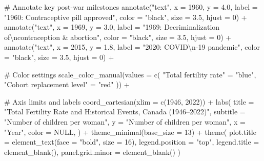 \documentclass[
  letterpaper,
  DIV=11,
  numbers=noendperiod]{scrartcl}
\newenvironment{Shaded}{\begin{snugshade}}{\end{snugshade}}
\newcommand{\AttributeTok}[1]{\textcolor[rgb]{0.40,0.45,0.13}{#1}}
\newcommand{\CommentTok}[1]{\textcolor[rgb]{0.37,0.37,0.37}{#1}}
\newcommand{\ConstantTok}[1]{\textcolor[rgb]{0.56,0.35,0.01}{#1}}
\newcommand{\DecValTok}[1]{\textcolor[rgb]{0.68,0.00,0.00}{#1}}
\newcommand{\FloatTok}[1]{\textcolor[rgb]{0.68,0.00,0.00}{#1}}
\newcommand{\FunctionTok}[1]{\textcolor[rgb]{0.28,0.35,0.67}{#1}}
\newcommand{\NormalTok}[1]{\textcolor[rgb]{0.00,0.23,0.31}{#1}}
\newcommand{\OtherTok}[1]{\textcolor[rgb]{0.00,0.23,0.31}{#1}}
\newcommand{\SpecialCharTok}[1]{\textcolor[rgb]{0.37,0.37,0.37}{#1}}
\newcommand{\StringTok}[1]{\textcolor[rgb]{0.13,0.47,0.30}{#1}}
\begin{document}
\begin{Shaded}
\begin{Highlighting}[]
  \CommentTok{\# Annotate key post{-}war milestones}
  \FunctionTok{annotate}\NormalTok{(}\StringTok{"text"}\NormalTok{, }\AttributeTok{x =} \DecValTok{1960}\NormalTok{, }\AttributeTok{y =} \FloatTok{4.0}\NormalTok{, }\AttributeTok{label =} \StringTok{"1960: Contraceptive pill approved"}\NormalTok{,}
           \AttributeTok{color =} \StringTok{"black"}\NormalTok{, }\AttributeTok{size =} \FloatTok{3.5}\NormalTok{, }\AttributeTok{hjust =} \DecValTok{0}\NormalTok{) }\SpecialCharTok{+}
  \FunctionTok{annotate}\NormalTok{(}\StringTok{"text"}\NormalTok{, }\AttributeTok{x =} \DecValTok{1969}\NormalTok{, }\AttributeTok{y =} \FloatTok{3.0}\NormalTok{, }\AttributeTok{label =} \StringTok{"1969: Decriminalization of}\SpecialCharTok{\textbackslash{}n}\StringTok{contraception \& abortion"}\NormalTok{,}
           \AttributeTok{color =} \StringTok{"black"}\NormalTok{, }\AttributeTok{size =} \FloatTok{3.5}\NormalTok{, }\AttributeTok{hjust =} \DecValTok{0}\NormalTok{) }\SpecialCharTok{+}
  \FunctionTok{annotate}\NormalTok{(}\StringTok{"text"}\NormalTok{, }\AttributeTok{x =} \DecValTok{2015}\NormalTok{, }\AttributeTok{y =} \FloatTok{1.8}\NormalTok{, }\AttributeTok{label =} \StringTok{"2020: COVID}\SpecialCharTok{\textbackslash{}n}\StringTok{{-}19 pandemic"}\NormalTok{,}
           \AttributeTok{color =} \StringTok{"black"}\NormalTok{, }\AttributeTok{size =} \FloatTok{3.5}\NormalTok{, }\AttributeTok{hjust =} \DecValTok{0}\NormalTok{) }\SpecialCharTok{+}

  \CommentTok{\# Color settings}
  \FunctionTok{scale\_color\_manual}\NormalTok{(}\AttributeTok{values =} \FunctionTok{c}\NormalTok{(}
    \StringTok{"Total fertility rate"} \OtherTok{=} \StringTok{"blue"}\NormalTok{,}
    \StringTok{"Cohort replacement level"} \OtherTok{=} \StringTok{"red"}
\NormalTok{  )) }\SpecialCharTok{+}

  \CommentTok{\# Axis limits and labels}
  \FunctionTok{coord\_cartesian}\NormalTok{(}\AttributeTok{xlim =} \FunctionTok{c}\NormalTok{(}\DecValTok{1946}\NormalTok{, }\DecValTok{2022}\NormalTok{)) }\SpecialCharTok{+}
  \FunctionTok{labs}\NormalTok{(}
    \AttributeTok{title =} \StringTok{"Total Fertility Rate and Historical Events, Canada (1946–2022)"}\NormalTok{,}
    \AttributeTok{subtitle =} \StringTok{"Number of children per woman"}\NormalTok{,}
    \AttributeTok{y =} \StringTok{"Number of children per woman"}\NormalTok{,}
    \AttributeTok{x =} \StringTok{"Year"}\NormalTok{,}
    \AttributeTok{color =} \ConstantTok{NULL}\NormalTok{,}
\NormalTok{  ) }\SpecialCharTok{+}
  \FunctionTok{theme\_minimal}\NormalTok{(}\AttributeTok{base\_size =} \DecValTok{13}\NormalTok{) }\SpecialCharTok{+}
  \FunctionTok{theme}\NormalTok{(}
    \AttributeTok{plot.title =} \FunctionTok{element\_text}\NormalTok{(}\AttributeTok{face =} \StringTok{"bold"}\NormalTok{, }\AttributeTok{size =} \DecValTok{16}\NormalTok{),}
    \AttributeTok{legend.position =} \StringTok{"top"}\NormalTok{,}
    \AttributeTok{legend.title =} \FunctionTok{element\_blank}\NormalTok{(),}
    \AttributeTok{panel.grid.minor =} \FunctionTok{element\_blank}\NormalTok{()}
\NormalTok{  )}
\end{Highlighting}
\end{Shaded}
\end{document}

